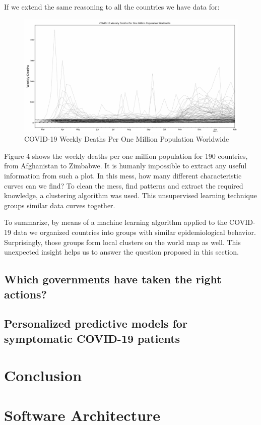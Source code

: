 \documentclass[11pt,a4paper]{article}
\begin{document}
If we extend the same reasoning to all the countries we have data for:
\begin{figure}[H]
    \begin{center}
        \hspace*{-1.7cm}
        \includegraphics[scale=0.46]{img/weekly-deaths-worldwide.pdf}
    \end{center}
    \caption{COVID-19 Weekly Deaths Per One Million Population Worldwide}
\end{figure}
\noindent Figure 4 shows the weekly deaths per one million population for 190
countries, from Afghanistan to Zimbabwe. It is humanly impossible to extract
any useful information from such a plot. In this mess, how many different
characteristic curves can we find? To clean the mess, find patterns and extract
the required knowledge, a clustering algorithm was used. This unsupervised
learning technique groups similar data curves together.


To summarize, by means of a machine learning algorithm applied to the COVID-19
data we organized countries into groups with similar epidemiological behavior.
Surprisingly, those groups form local clusters on the world map as well. This
unexpected insight helps us to answer the question proposed in this section.

\subsection{Which governments have taken the right actions?}
\subsection{Personalized predictive models for symptomatic COVID-19 patients}
\section{Conclusion}

\section{Software Architecture}

\printbibliography
\end{document}
